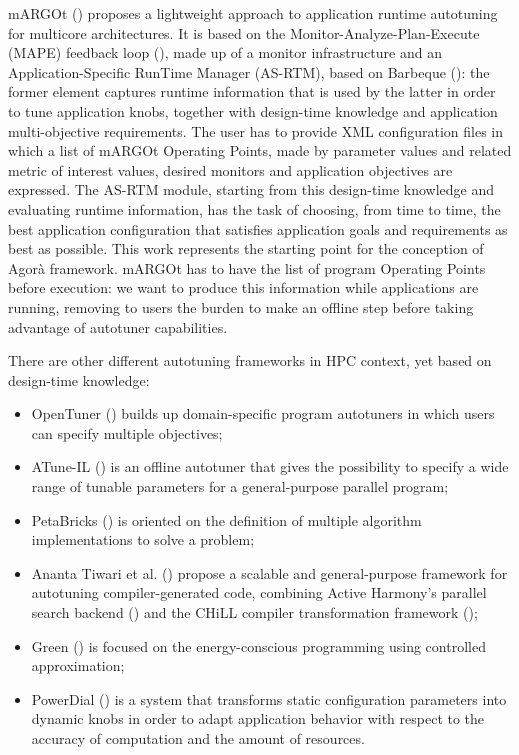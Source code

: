 mARGOt (\cite{gadioli2015application}) proposes a lightweight approach to application runtime autotuning for multicore architectures. It is based on the Monitor-Analyze-Plan-Execute (MAPE) feedback loop (\cite{kephart2003vision}), made up of a monitor infrastructure and an Application-Specific RunTime Manager (AS-RTM), based on Barbeque \hbox{(\cite{bellasi2012rtrm})}: the former element captures runtime information that is used by the latter in order to tune application knobs, together with design-time knowledge and application multi-objective requirements. The user has to provide XML configuration files in which a list of mARGOt Operating Points, made by parameter values and related metric of interest values, desired monitors and application objectives are expressed. The AS-RTM module, starting from this design-time knowledge and evaluating runtime information, has the task of choosing, from time to time, the best application configuration that satisfies application goals and requirements as best as possible. This work represents the starting point for the conception of Agorà framework. mARGOt has to have the list of program Operating Points before execution: we want to produce this information while applications are running, removing to users the burden to make an offline step before taking advantage of autotuner capabilities.

There are other different autotuning frameworks in HPC context, yet based on design-time knowledge: 

\begin{itemize}

	\item OpenTuner (\cite{ansel2014opentuner}) builds up domain-specific program autotuners in which users can specify multiple objectives;
	
	\item ATune-IL (\cite{schaefer2009atune}) is an offline autotuner that gives the possibility to specify a wide range of tunable parameters for a general-purpose parallel program;

	\item PetaBricks (\cite{ansel2009petabricks}) is oriented on the definition of multiple algorithm implementations to solve a problem;

	\item Ananta Tiwari et al. (\cite{tiwari2009scalable}) propose a scalable and general-purpose framework for autotuning compiler-generated code, combining Active Harmony's parallel search backend (\cite{chung2004using}) and the CHiLL compiler transformation framework (\cite{chen2008chill});

	\item Green (\cite{baek2010green}) is focused on the energy-conscious programming using controlled approximation;

	\item PowerDial (\cite{hoffmann2011dynamic}) is a system that transforms static configuration parameters into dynamic knobs in order to adapt application behavior with respect to the accuracy of computation and the amount of resources.

\end{itemize}


